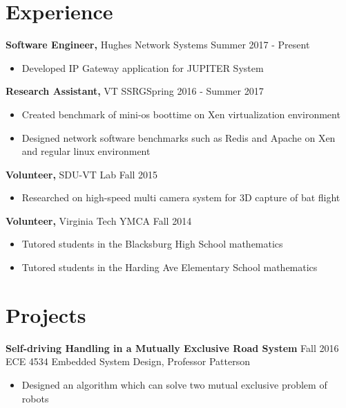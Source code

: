 \documentclass[margin]{res}
\begin{document}
\begin{resume}
  
\section{Experience} %

 {\bf Software Engineer,} Hughes Network Systems \hfill Summer 2017 - Present
 \begin{itemize} \itemsep -2pt  %
 \item Developed IP Gateway application for JUPITER System
 \end{itemize}

 {\bf Research Assistant,} VT SSRG\hfill Spring 2016 - Summer 2017
 \begin{itemize} \itemsep -2pt  %
 \item Created benchmark of mini-os boottime on Xen virtualization environment
 \item Designed network software benchmarks such as Redis and Apache on Xen and 
 	regular linux environment
 \end{itemize}

{\bf Volunteer,} SDU-VT Lab \hfill  Fall 2015
\begin{itemize} \itemsep -2pt %
\item Researched on high-speed multi camera system for 3D capture of bat flight
\end{itemize}

{\bf Volunteer,} Virginia Tech YMCA  \hfill
Fall 2014                
                \begin{itemize} \itemsep -2pt
                 \item  Tutored students in the Blacksburg High School mathematics
                
                 \item Tutored students in the Harding Ave Elementary School mathematics

		 \end{itemize}


\section{Projects} 
               {\bf Self-driving Handling in a Mutually Exclusive Road System}     \hfill         Fall 2016  \\           
                {ECE 4534 Embedded System Design, Professor Patterson} 
                 \begin{itemize} \itemsep -2pt
                 \item Designed an algorithm which can solve two mutual exclusive problem of robots
                 

\end{itemize}
\end{resume}
\end{document}
